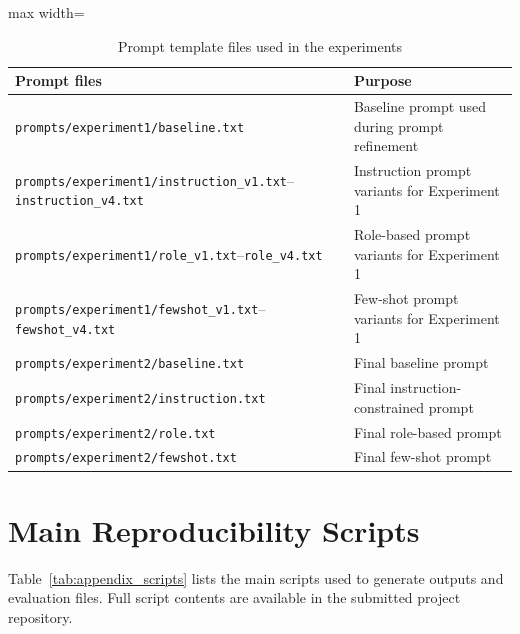 \begin{table}[htbp]
    \centering
    \caption{Prompt template files used in the experiments}
    \label{tab:appendix_prompt_files}
    \renewcommand{\arraystretch}{1.15}
    \begin{adjustbox}{max width=\textwidth}
    \begin{tabular}{p{5.5cm}p{7.5cm}}
        \toprule
        \textbf{Prompt files} & \textbf{Purpose} \\
        \midrule
        \texttt{prompts/experiment1/baseline.txt} & Baseline prompt used during prompt refinement \\
        \texttt{prompts/experiment1/instruction\_v1.txt}--\texttt{instruction\_v4.txt} & Instruction prompt variants for Experiment 1 \\
        \texttt{prompts/experiment1/role\_v1.txt}--\texttt{role\_v4.txt} & Role-based prompt variants for Experiment 1 \\
        \texttt{prompts/experiment1/fewshot\_v1.txt}--\texttt{fewshot\_v4.txt} & Few-shot prompt variants for Experiment 1 \\
        \texttt{prompts/experiment2/baseline.txt} & Final baseline prompt \\
        \texttt{prompts/experiment2/instruction.txt} & Final instruction-constrained prompt \\
        \texttt{prompts/experiment2/role.txt} & Final role-based prompt \\
        \texttt{prompts/experiment2/fewshot.txt} & Final few-shot prompt \\
        \bottomrule
    \end{tabular}
    \end{adjustbox}
\end{table}

\section{Main Reproducibility Scripts}

Table~\ref{tab:appendix_scripts} lists the main scripts used to generate outputs and evaluation files. Full script contents are available in the submitted project repository.

